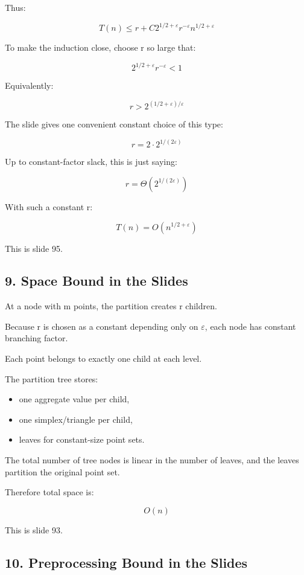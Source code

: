\documentclass[
  11pt,
]{article}
\providecommand{\tightlist}{%
  \setlength{\itemsep}{0pt}\setlength{\parskip}{0pt}}
\begin{document}
Thus:

\[
T(n)\le r+C2^{1/2+\varepsilon}r^{-\varepsilon}n^{1/2+\varepsilon}
\]

To make the induction close, choose r so large that:

\[
2^{1/2+\varepsilon}r^{-\varepsilon}<1
\]

Equivalently:

\[
r>2^{(1/2+\varepsilon)/\varepsilon}
\]

The slide gives one convenient constant choice of this type:

\[
r=2\cdot 2^{1/(2\varepsilon)}
\]

Up to constant-factor slack, this is just saying:

\[
r=\Theta(2^{1/(2\varepsilon)})
\]

With such a constant r:

\[
T(n)=O(n^{1/2+\varepsilon})
\]

This is slide 95.

\hypertarget{space-bound-in-the-slides}{%
\subsection{9. Space Bound in the
Slides}\label{space-bound-in-the-slides}}

At a node with m points, the partition creates r children.

Because r is chosen as a constant depending only on \(\varepsilon\),
each node has constant branching factor.

Each point belongs to exactly one child at each level.

The partition tree stores:

\begin{itemize}
\tightlist
\item
  one aggregate value per child,
\item
  one simplex/triangle per child,
\item
  leaves for constant-size point sets.
\end{itemize}

The total number of tree nodes is linear in the number of leaves, and
the leaves partition the original point set.

Therefore total space is:

\[
O(n)
\]

This is slide 93.

\hypertarget{preprocessing-bound-in-the-slides}{%
\subsection{10. Preprocessing Bound in the
Slides}\label{preprocessing-bound-in-the-slides}}
\end{document}
